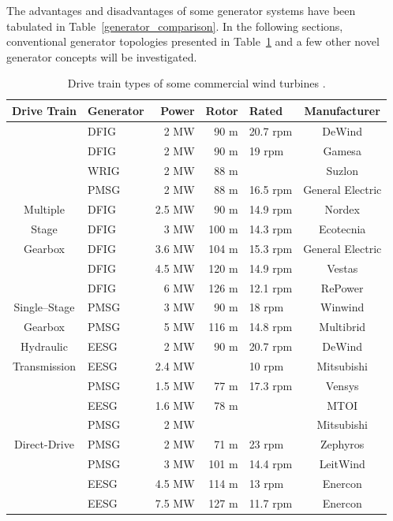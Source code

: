 \documentclass[a4paper, 11pt]{article} %
\begin{document}
The advantages and disadvantages of some generator systems have been tabulated in Table~\ref{generator_comparison}. In the following sections,  conventional generator topologies presented in Table~\ref{generator_manufacturers} and a few other novel generator concepts will be investigated.

\begin{table}
  \centering
  \begin{tabular}{clrrlc}
	  
	  Drive Train & Generator & Power & Rotor & Rated & Manufacturer \\
	  \hline
		& DFIG & 2 MW & 90 m & 20.7 rpm & DeWind \\
		& DFIG & 2 MW & 90 m & 19 rpm & Gamesa \\
	  	& WRIG & 2 MW & 88 m &  & Suzlon \\
	  	& PMSG & 2 MW & 88 m & 16.5 rpm & General Electric \\
	 Multiple 	& DFIG & 2.5 MW & 90 m & 14.9 rpm & Nordex \\
	Stage  	& DFIG & 3 MW & 100 m & 14.3 rpm & Ecotecnia \\
  	Gearbox & DFIG & 3.6 MW & 104 m & 15.3 rpm & General Electric \\
	  	& DFIG & 4.5 MW & 120 m & 14.9 rpm & Vestas \\
	  	& DFIG & 6 MW & 126 m & 12.1 rpm & RePower \\
	  	\hline
	Single--Stage  	& PMSG & 3 MW & 90 m & 18 rpm & Winwind \\
	Gearbox  	& PMSG & 5 MW & 116 m & 14.8 rpm & Multibrid \\
	  	\hline
	 Hydraulic 	& EESG & 2 MW & 90 m & 20.7 rpm & DeWind \\
	 Transmission 	& EESG & 2.4 MW &  & 10 rpm & Mitsubishi \\
	  	\hline
	  	& PMSG & 1.5 MW & 77 m & 17.3 rpm & Vensys \\
	  	& EESG & 1.6 MW & 78 m &  & MTOI \\
	  	& PMSG & 2 MW &  &  & Mitsubishi \\
	Direct-Drive  	& PMSG & 2 MW & 71 m & 23 rpm & Zephyros \\
	  	& PMSG & 3 MW & 101 m & 14.4 rpm & LeitWind \\
	  	& EESG & 4.5 MW & 114 m & 13 rpm & Enercon \\
	  	& EESG & 7.5 MW & 127 m & 11.7 rpm & Enercon \\
	  \hline

  \end{tabular}
  \caption{Drive train types of some commercial wind turbines \cite{wind_energy_facts,upwind2011}.}
  \label{generator_manufacturers}
\end{table}
\end{document}
